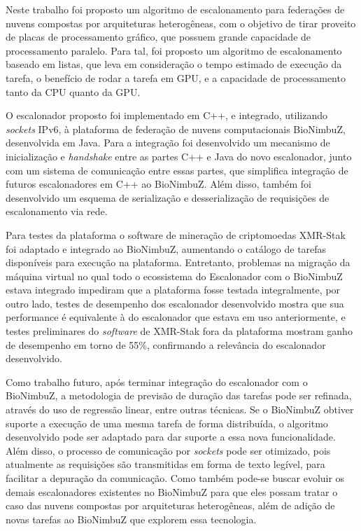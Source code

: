 Neste trabalho foi proposto um algoritmo de escalonamento para federações de nuvens compostas por arquiteturas heterogêneas, com o objetivo de tirar proveito de placas de processamento gráfico, que possuem grande capacidade de processamento paralelo. Para tal, foi proposto um algoritmo de escalonamento baseado em listas, que leva em consideração o tempo estimado de execução da tarefa, o benefício de rodar a tarefa em \acrshort{GPU}, e a capacidade de processamento tanto da \acrshort{CPU} quanto da \acrshort{GPU}.

O escalonador proposto foi implementado em C++, e integrado, utilizando \textit{sockets} \acrshort{IP}v6, à plataforma de federação de nuvens computacionais BioNimbuZ, desenvolvida em Java. Para a integração foi desenvolvido um mecanismo de inicialização e \textit{handshake} entre as partes C++ e Java do novo escalonador, junto com um sistema de comunicação entre essas partes, que simplifica integração de futuros escalonadores em C++ ao BioNimbuZ. Além disso, também foi desenvolvido um esquema de serialização e desserialização de requisições de escalonamento via rede.

Para testes da plataforma o software de mineração de criptomoedas XMR-Stak foi adaptado e integrado ao BioNimbuZ, aumentando o catálogo de tarefas disponíveis para execução na plataforma. Entretanto, problemas na migração da máquina virtual no qual todo o ecossistema do Escalonador com o BioNimbuZ estava integrado impediram que a plataforma fosse testada integralmente, por outro lado, testes de desempenho dos escalonador desenvolvido mostra que sua performance é equivalente à do escalonador que estava em uso anteriormente, e testes preliminares do \textit{software} de XMR-Stak fora da plataforma mostram ganho de desempenho em torno de 55\%, confirmando a relevância do escalonador desenvolvido.


Como trabalho futuro, após terminar integração do escalonador com o BioNimbuZ, a metodologia de previsão de duração das tarefas pode ser refinada, através do uso de regressão linear, entre outras técnicas. Se o BioNimbuZ obtiver suporte a execução de uma mesma tarefa de forma distribuída, o algoritmo desenvolvido pode ser adaptado para dar suporte a essa nova funcionalidade. Além disso, o processo de comunicação por \textit{sockets} pode ser otimizado, pois atualmente as requisições são transmitidas em forma de texto legível, para facilitar a depuração da comunicação. Como também pode-se buscar evoluir os demais escalonadores existentes no BioNimbuZ para que eles possam tratar o caso das nuvens compostas por arquiteturas heterogêneas, além de adição de novas tarefas ao BioNimbuZ que explorem essa tecnologia.

